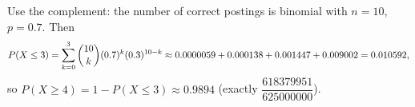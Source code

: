 Use the complement: the number of correct postings is binomial with $n=10$, $p=0.7$. Then
\[
P(X\le3)=\sum_{k=0}^{3}\dbinom{10}{k}(0.7)^k(0.3)^{10-k}\approx0.0000059+0.000138+0.001447+0.009002=0.010592,
\]
so $P(X\ge4)=1-P(X\le3)\approx\boxed{0.9894}$ (exactly $\dfrac{618379951}{625000000}$).
